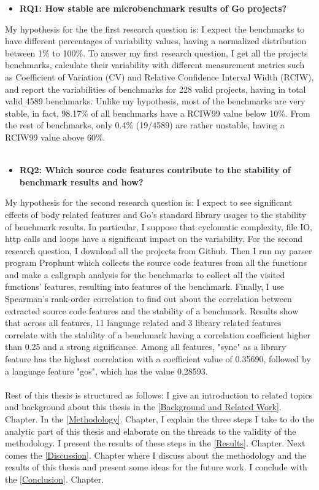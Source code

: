 \documentclass{seal_thesis}
\begin{document}
\begin{itemize}
	\item \textbf{RQ1: How stable are microbenchmark results of Go projects?}
\end{itemize}

\noindent My hypothesis for the the first research question is: I expect the benchmarks to have different percentages of variability values, having a normalized distribution between 1\% to 100\%. To answer my first research question, I get all the projects benchmarks, calculate their variability with different measurement metrics such as Coefficient of Variation (CV) and Relative Confidence Interval Width (RCIW), and report the variabilities of benchmarks for 228 valid projects, having in total valid 4589 benchmarks. Unlike my hypothesis, most of the benchmarks are very stable, in fact, 98.17\% of all benchmarks have a RCIW99 value below 10\%. From the rest of benchmarks, only 0.4\% (19/4589) are rather unstable, having a RCIW99 value above 60\%.\\
\\
\begin{itemize}
	\item \textbf{RQ2: Which source code features contribute to the stability of benchmark results and how?}
\end{itemize}

\noindent My hypothesis for the second research question is: I expect to see significant effects of body related features and Go's standard library usages to the stability of benchmark results. In particular, I suppose that cyclomatic complexity, file IO, http calls and loops have a significant impact on the variability. For the second research question, I download all the projects from Github. Then I run my parser program Prophunt which collects the source code features from all the functions and make a callgraph analysis for the benchmarks to collect all the visited functions' features, resulting into features of the benchmark. Finally, I use Spearman's rank-order correlation to find out about the correlation between extracted source code features and the stability of a benchmark. Results show that across all features, 11 language related and 3 library related features correlate with the stability of a benchmark having a correlation coefficient higher than 0.25 and a strong significance. Among all features, "sync" as a library feature has the highest correlation with a coefficient value of 0.35690, followed by a language feature "gos", which has the value 0,28593.\\
\\
Rest of this thesis is structured as follows: I give an introduction to related topics and background about this thesis in the \ref{Background and Related Work}. Chapter. In the \ref{Methodology}. Chapter, I explain the three steps I take to do the analytic part of this thesis and elaborate on the threads to the validity of the methodology. I present the results of these steps in the \ref{Results}. Chapter. Next comes the \ref{Discussion}. Chapter where I discuss about the methodology and the results of this thesis and present some ideas for the future work. I conclude with the \ref{Conclusion}. Chapter.
\end{document}
